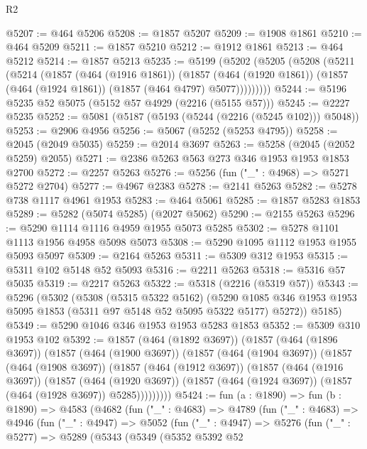 \begin{lexlean}{R2}
\begin{coremodule}
@5207 := @464 @5206
@5208 := @1857 @5207
@5209 := @1908 @1861
@5210 := @464 @5209
@5211 := @1857 @5210
@5212 := @1912 @1861
@5213 := @464 @5212
@5214 := @1857 @5213
@5235 := @5199
    (@5202
      (@5205
        (@5208
          (@5211
            (@5214
              (@1857
                (@464 (@1916 @1861))
                (@1857
                  (@464 (@1920 @1861))
                  (@1857 (@464 (@1924 @1861)) (@1857 (@464 @4797) @5077)))))))))
@5244 := @5196 @5235 @52 @5075 (@5152 @57 @4929 (@2216 (@5155 @57)))
@5245 := @2227 @5235
@5252 := @5081 (@5187 (@5193 (@5244 (@2216 (@5245 @102))) @5048))
@5253 := @2906 @4956
@5256 := @5067 (@5252 (@5253 @4795))
@5258 := @2045 (@2049 @5035)
@5259 := @2014 @3697
@5263 := @5258 (@2045 (@2052 @5259) @2055)
@5271 := @2386 @5263 @563 @273 @346 @1953 @1953 @1853 @2700
@5272 := @2257 @5263
@5276 := @5256 (fun ("_" : @4968) => @5271 @5272 @2704)
@5277 := @4967 @2383
@5278 := @2141 @5263
@5282 := @5278 @738 @1117 @4961 @1953
@5283 := @464 @5061
@5285 := @1857 @5283 @1853
@5289 := @5282 (@5074 @5285) (@2027 @5062)
@5290 := @2155 @5263
@5296 := @5290 @1114 @1116 @4959 @1955 @5073 @5285
@5302 := @5278 @1101 @1113 @1956 @4958 @5098 @5073
@5308 := @5290 @1095 @1112 @1953 @1955 @5093 @5097
@5309 := @2164 @5263
@5311 := @5309 @312 @1953
@5315 := @5311 @102 @5148 @52 @5093
@5316 := @2211 @5263
@5318 := @5316 @57 @5035
@5319 := @2217 @5263
@5322 := @5318 (@2216 (@5319 @57))
@5343 := @5296
    (@5302
      (@5308
        (@5315 @5322 @5162)
        (@5290 @1085 @346 @1953 @1953 @5095 @1853 (@5311 @97 @5148 @52 @5095 @5322 @5177) @5272))
      @5185)
@5349 := @5290 @1046 @346 @1953 @1953 @5283 @1853
@5352 := @5309 @310 @1953 @102
@5392 := @1857
    (@464 (@1892 @3697))
    (@1857
      (@464 (@1896 @3697))
      (@1857
        (@464 (@1900 @3697))
        (@1857
          (@464 (@1904 @3697))
          (@1857
            (@464 (@1908 @3697))
            (@1857
              (@464 (@1912 @3697))
              (@1857
                (@464 (@1916 @3697))
                (@1857
                  (@464 (@1920 @3697))
                  (@1857 (@464 (@1924 @3697)) (@1857 (@464 (@1928 @3697)) @5285)))))))))
@5424 := fun (a : @1890) =>
  fun (b : @1890) =>
  @4583
    (@4682
      (fun ("_" : @4683) =>
      @4789
        (fun ("_" : @4683) =>
        @4946
          (fun ("_" : @4947) =>
          @5052
            (fun ("_" : @4947) =>
            @5276
              (fun ("_" : @5277) =>
              @5289
                (@5343
                  (@5349
                    (@5352
                      @5392
                      @52

\end{coremodule}
\end{lexlean}
